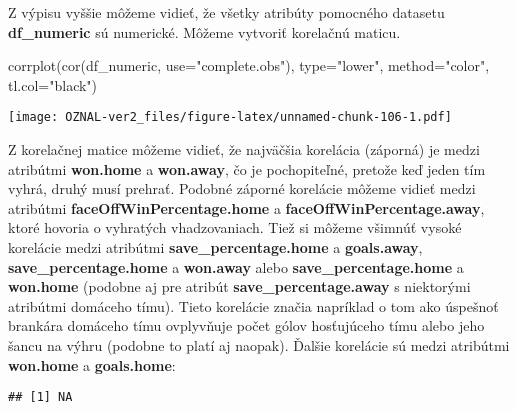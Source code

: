 \documentclass[
]{article}
\newenvironment{Shaded}{\begin{snugshade}}{\end{snugshade}}
\newcommand{\AttributeTok}[1]{\textcolor[rgb]{0.77,0.63,0.00}{#1}}
\newcommand{\FunctionTok}[1]{\textcolor[rgb]{0.00,0.00,0.00}{#1}}
\newcommand{\NormalTok}[1]{#1}
\newcommand{\SpecialCharTok}[1]{\textcolor[rgb]{0.00,0.00,0.00}{#1}}
\newcommand{\StringTok}[1]{\textcolor[rgb]{0.31,0.60,0.02}{#1}}
\begin{document}
Z výpisu vyššie môžeme vidieť, že všetky atribúty pomocného datasetu
\textbf{df\_numeric} sú numerické. Môžeme vytvoriť korelačnú maticu.

\begin{Shaded}
\begin{Highlighting}[]
\FunctionTok{corrplot}\NormalTok{(}\FunctionTok{cor}\NormalTok{(df\_numeric, }\AttributeTok{use=}\StringTok{"complete.obs"}\NormalTok{), }\AttributeTok{type=}\StringTok{"lower"}\NormalTok{, }\AttributeTok{method=}\StringTok{"color"}\NormalTok{, }\AttributeTok{tl.col=}\StringTok{"black"}\NormalTok{)}
\end{Highlighting}
\end{Shaded}

\texttt{[image: OZNAL-ver2\_files/figure-latex/unnamed-chunk-106-1.pdf]}

Z korelačnej matice môžeme vidieť, že najväčšia korelácia (záporná) je
medzi atribútmi \textbf{won.home} a \textbf{won.away}, čo je
pochopiteľné, pretože keď jeden tím vyhrá, druhý musí prehrať. Podobné
záporné korelácie môžeme vidieť medzi atribútmi
\textbf{faceOffWinPercentage.home} a \textbf{faceOffWinPercentage.away},
ktoré hovoria o vyhratých vhadzovaniach. Tiež si môžeme všimnúť vysoké
korelácie medzi atribútmi \textbf{save\_percentage.home} a
\textbf{goals.away}, \textbf{save\_percentage.home} a \textbf{won.away}
alebo \textbf{save\_percentage.home} a \textbf{won.home} (podobne aj pre
atribút \textbf{save\_percentage.away} s niektorými atribútmi domáceho
tímu). Tieto korelácie značia napríklad o tom ako úspešnoť brankára
domáceho tímu ovplyvňuje počet gólov hosťujúceho tímu alebo jeho šancu
na výhru (podobne to platí aj naopak). Ďalšie korelácie sú medzi
atribútmi \textbf{won.home} a \textbf{goals.home}:

\begin{Shaded}
\end{Shaded}

\begin{verbatim}
## [1] NA
\end{verbatim}

\begin{Shaded}
\end{Shaded}
\end{document}
